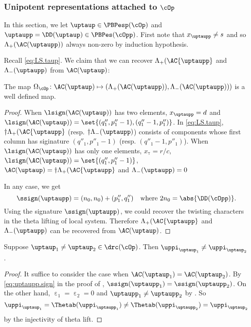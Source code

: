 \documentclass[ssunip]{subfiles}
\begin{document}
\subsubsection{Unipotent representations attached to $\cOp$}
In this section, we let $\uptaup\in \PBPesp(\cOp)$ and
$\uptaupp  = \DD(\uptaup)\in \PBPes(\cOpp)$. First note that
$x_{\uptaupp}\neq s$ and so $\Lambda_+(\AC( \uptaupp ))$ always non-zero
by induction hypothesis.

Recall \eqref{eq:LS.taup}.
We claim that we can recover $\Lambda_+(\AC{\uptaupp}$ and
$\nAC{\uptaupp}$ from $\oAC{\uptaup}$:
\begin{lem}\label{c:gd.C1}
  The map $\Omega_{\cOp}\colon \oAC{\uptaup}\mapsto (\Lambda_+(\AC( \uptaupp)),\Lambda_-(\AC( \uptaupp)))$ is a well
  defined map.
\end{lem}
\begin{proof}
  When $\lsign(\oAC{\uptaup})$ has two elements, $x_{\uptaupp}=d$ and
  $\lsign(\oAC{\uptaup}) = \set{(q''_{1},p''_{1}-1),(q''_{1}-1,p''_{1})}$. In
  \eqref{eq:LS.taup}, $\dagger\Lambda_+(\AC{\uptaupp}$ (resp. $\dagger\nAC{\uptaupp}$)
  consists of components whose first column has siginature $(q''_{1},p''_{1}-1)$
  (resp. $(q''_{1}-1,p''_{1})$). When $\lsign(\oAC{\uptaup})$ has only one
  elements, $x_{\uptau}=r/c$,
  $\lsign(\oAC{\uptaup}) = \set{(q''_{1},p''_{1}-1)}$,
  $\oAC{\uptaup} = \dagger\Lambda_+(\AC{\uptaupp}$ and $\nAC{\uptaupp}=0$

  In any case, we get
  \begin{equation}\label{eq:uptaupp.sign}
    \ssign(\uptaupp) = (n_{0},n_{0})+(p''_{1},q''_{1})\quad \text{where }
    2n_{0} = \abs{\DD(\cOpp)}.
  \end{equation}
  Using the signature $\ssign(\uptaupp)$, we could recover the twisting
  characters in the theta lifting of local system. Therefore
  $\Lambda_+(\AC{\uptaupp}$ and $\nAC{\uptaupp}$ can be recovered from  $\oAC{\uptaup}$.
\end{proof}


\begin{lem}\label{c:gd.C3}
  Suppose $\uptaup_{1}\neq \uptaup_{2}\in \drc(\cOp)$. Then
  $\uppi_{\uptaup_{1}}\neq \uppi_{\uptaup_{2}}$.
\end{lem}
\begin{proof}
  It suffice to consider the case when $\oAC{\uptaup_{1}} = \oAC{\uptaup_{2}}$.
 By \eqref{eq:uptaupp.sign} in the proof of ,
 $\ssign(\uptaupp_{1}) = \ssign(\uptaupp_{2})$.
 On the other hand, $\upepsilon_{1}=\upepsilon_{2}=0$ and
 $\uptaupp_{1}\neq \uptaupp_{2}$ by . So
 \[
   \uppi_{\uptaup_{1}} = \Thetab(\uppi_{\uptaupp_{1}})\neq\Thetab(\uppi_{\uptaupp_{2}}) = \uppi_{\uptaup_{2}}
 \]
  by the injectivity of theta lift.
\end{proof}
\end{document}
